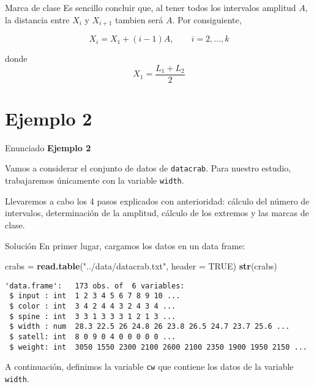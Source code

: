 \documentclass[
  ignorenonframetext,
]{beamer}
\newenvironment{Shaded}{\begin{snugshade}}{\end{snugshade}}
\newcommand{\DataTypeTok}[1]{\textcolor[rgb]{0.13,0.29,0.53}{#1}}
\newcommand{\KeywordTok}[1]{\textcolor[rgb]{0.13,0.29,0.53}{\textbf{#1}}}
\newcommand{\NormalTok}[1]{#1}
\newcommand{\OperatorTok}[1]{\textcolor[rgb]{0.81,0.36,0.00}{\textbf{#1}}}
\newcommand{\OtherTok}[1]{\textcolor[rgb]{0.56,0.35,0.01}{#1}}
\newcommand{\StringTok}[1]{\textcolor[rgb]{0.31,0.60,0.02}{#1}}
\begin{document}
\begin{frame}{Marca de clase}
\protect\hypertarget{marca-de-clase-1}{}
Es sencillo concluir que, al tener todos los intervalos amplitud \(A\),
la distancia entre \(X_i\) y \(X_{i+1}\) tambien será \(A\). Por
consiguiente,

\[X_{i} = X_1+ (i-1)A,\qquad i=2,\dots,k\]

donde \[X_1 = \frac{L_1+L_2}{2}\]
\end{frame}

\hypertarget{ejemplo-2}{%
\section{Ejemplo 2}\label{ejemplo-2}}

\begin{frame}[fragile]{Enunciado}
\protect\hypertarget{enunciado}{}
\textbf{Ejemplo 2}

Vamos a considerar el conjunto de datos de \texttt{datacrab}. Para
nuestro estudio, trabajaremos únicamente con la variable \texttt{width}.

Llevaremos a cabo los 4 pasos explicados con anterioridad: cálculo del
número de intervalos, determinación de la amplitud, cálculo de los
extremos y las marcas de clase.
\end{frame}

\begin{frame}[fragile]{Solución}
\protect\hypertarget{soluciuxf3n}{}
En primer lugar, cargamos los datos en un data frame:

\begin{Shaded}
\begin{Highlighting}[]
\NormalTok{crabs =}\StringTok{ }\KeywordTok{read.table}\NormalTok{(}\StringTok{"../data/datacrab.txt"}\NormalTok{, }\DataTypeTok{header =} \OtherTok{TRUE}\NormalTok{)}
\KeywordTok{str}\NormalTok{(crabs)}
\end{Highlighting}
\end{Shaded}

\begin{verbatim}
'data.frame':   173 obs. of  6 variables:
 $ input : int  1 2 3 4 5 6 7 8 9 10 ...
 $ color : int  3 4 2 4 4 3 2 4 3 4 ...
 $ spine : int  3 3 1 3 3 3 1 2 1 3 ...
 $ width : num  28.3 22.5 26 24.8 26 23.8 26.5 24.7 23.7 25.6 ...
 $ satell: int  8 0 9 0 4 0 0 0 0 0 ...
 $ weight: int  3050 1550 2300 2100 2600 2100 2350 1900 1950 2150 ...
\end{verbatim}

\begin{Shaded}
\end{Shaded}

A continuación, definimos la variable \texttt{cw} que contiene los datos
de la variable \texttt{width}.
\end{frame}
\end{document}
